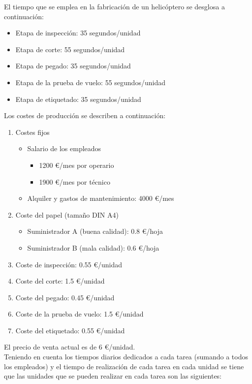 \documentclass[12pt,a4paper,twoside,openright,titlepage,final]{article}
\begin{document}
El tiempo que se emplea en la fabricación de un helicóptero se desglosa a continuación:

\begin{itemize}
	\item Etapa de inspección: 35 segundos/unidad
	\item Etapa de corte: 55 segundos/unidad
	\item Etapa de pegado: 35 segundos/unidad
	\item Etapa de la prueba de vuelo: 55 segundos/unidad
	\item Etapa de etiquetado: 35 segundos/unidad
\end{itemize}

Los costes de producción se describen a continuación:

\begin{enumerate}
	\item Costes fijos
	\begin{itemize}
		\item Salario de los empleados
		\begin{itemize}
			\item 1200 €/mes por operario
			\item 1900 €/mes por técnico
		\end{itemize}
		\item Alquiler y gastos de mantenimiento: 4000 €/mes 
	\end{itemize}
	
	\item Coste del papel (tamaño DIN A4)
	\begin{itemize}
		\item Suministrador A (buena calidad): 0.8 €/hoja
		\item Suministrador B (mala calidad): 0.6 €/hoja
	\end{itemize}
	
	\item Coste de inspección: 0.55 €/unidad
	\item Coste del corte: 1.5 €/unidad
	\item Coste del pegado: 0.45 €/unidad
	\item Coste de la prueba de vuelo: 1.5 €/unidad
	\item Coste del etiquetado: 0.55 €/unidad
\end{enumerate}

El precio de venta actual es de 6 €/unidad.\\

Teniendo en cuenta los tiempos diarios dedicados a cada tarea (sumando a todos los empleados) y el tiempo de realización de cada tarea en cada unidad se tiene que las unidades que se pueden realizar en cada tarea son las siguientes:
\end{document}
